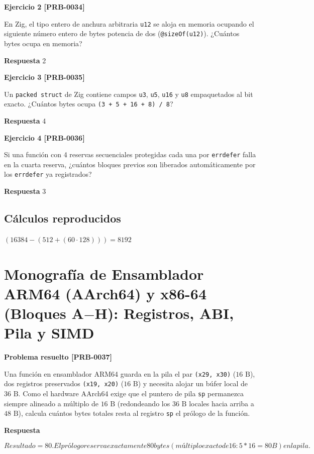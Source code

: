 \documentclass{book}
\begin{document}
\noindent\textbf{Ejercicio 2 [PRB-0034]}

En Zig, el tipo entero de anchura arbitraria \texttt{u12} se aloja en memoria ocupando el siguiente número entero de bytes potencia de dos (\texttt{@sizeOf(u12)}). ¿Cuántos bytes ocupa en memoria?

\noindent\textbf{Respuesta} 2

\noindent\textbf{Ejercicio 3 [PRB-0035]}

Un \texttt{packed struct} de Zig contiene campos \texttt{u3}, \texttt{u5}, \texttt{u16} y \texttt{u8} empaquetados al bit exacto. ¿Cuántos bytes ocupa \texttt{(3 + 5 + 16 + 8) / 8}?

\noindent\textbf{Respuesta} 4

\noindent\textbf{Ejercicio 4 [PRB-0036]}

Si una función con 4 reservas secuenciales protegidas cada una por \texttt{errdefer} falla en la cuarta reserva, ¿cuántos bloques previos son liberados automáticamente por los \texttt{errdefer} ya registrados?

\noindent\textbf{Respuesta} 3

\subsection*{Cálculos reproducidos}

\(\left(16384-\left(512+\left(60\cdot 128\right)\right)\right) = 8192\)

\section{Monografía de Ensamblador ARM64 (AArch64) y x86-64 (Bloques A\(-\)H): Registros, ABI, Pila y SIMD}

\noindent\textbf{Problema resuelto [PRB-0037]}

Una función en ensamblador ARM64 guarda en la pila el par \texttt{(x29, x30)} (\(16\text{ B}\)), dos registros preservados \texttt{(x19, x20)} (\(16\text{ B}\)) y necesita alojar un búfer local de \(36\text{ B}\). Como el hardware AArch64 exige que el puntero de pila \texttt{sp} permanezca siempre alineado a múltiplo de \(16\text{ B}\) (redondeando los \(36\text{ B}\) locales hacia arriba a \(48\text{ B}\)), calcula cuántos bytes totales resta al registro \texttt{sp} el prólogo de la función.

\noindent\textbf{Respuesta}

\[
Resultado = 80. El prólogo reserva exactamente 80 bytes (múltiplo exacto de 16: 5 * 16 = 80 B) en la pila.
\]
\end{document}
